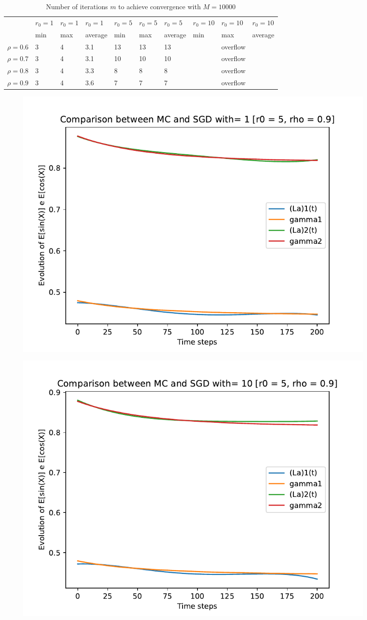 \documentclass[a4paper,11pt,openright]{report}
\begin{document}
\begin{table}[H]
\centering
\addtolength{\leftskip}{-1.5cm}
\addtolength{\rightskip}{-1.5cm}
\begin{tabular}{|c|lllllllll|}
\hline
$ $ & $r_0 = 1$ & $r_0 = 1$ & $r_0 = 1$ & $r_0 = 5$ & $r_0 = 5$ & $r_0 = 5$ & $r_0 = 10$ & $r_0 = 10$ & $r_0 = 10$  \\
$ $ & min & max & average & min & max & average & min & max & average \\ 
\hline
$\rho = 0.6$ & 3 & 4 & 3.1 & 13 & 13 & 13 &  & overflow &  \\

$\rho = 0.7$ & 3 & 4 & 3.1 & 10 & 10 & 10 &  & overflow &  \\

$\rho = 0.8$ & 3 & 4 & 3.3 & 8 & 8 & 8 &  & overflow & \\

$\rho = 0.9$ & 3 & 4 & 3.6 & 7 & 7 & 7 &  & overflow & \\
\hline
\end{tabular}
\caption{Number of iterations $m$ to achieve convergence with $M = 10000$}
\end{table}
\begin{figure}[H]
\centering
\includegraphics[width=0.9\textwidth]{images/graphs T = 2/n = 4, M = 1 sine and cosine.pdf}
\end{figure}
\begin{figure}[H]
\centering
\includegraphics[width=0.9\textwidth]{images/graphs T = 2/n = 4, M = 10 sine and cosine.pdf}
\end{figure}
\end{document}
